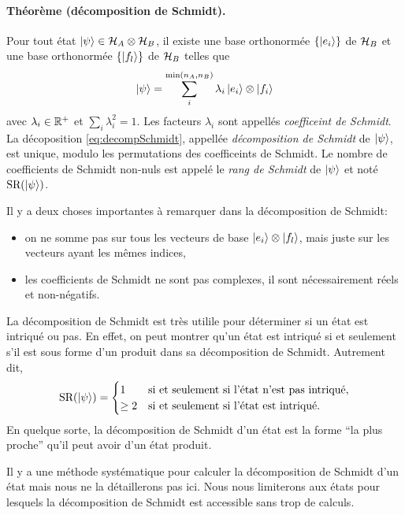 \documentclass[11pt,a4paper,oneside]{article}
\begin{document}
\paragraph*{Théorème (décomposition de Schmidt).} Pour tout état $\ket{\psi}\in\mathcal{H}_A\otimes\mathcal{H}_B$, il existe une base orthonormée $\{\ket{e_i}\}$ de $\mathcal{H}_B$ et une base orthonormée $\{\ket{f_l}\}$ de $\mathcal{H}_B$ telles que
\begin{equation}
    \ket{\psi}=\sum^{\min(n_A,n_B)}_{i} \lambda_i \ket{e_i}\otimes\ket{f_i}\label{eq:decompSchmidt}
\end{equation}
avec $\lambda_i\in\mathbb{R}^+$ et $\sum_i\lambda^2_i=1$. Les facteurs $\lambda_i$ sont appellés \emph{coefficeint de Schmidt}. La décoposition \eqref{eq:decompSchmidt}, appellée \emph{décomposition de Schmidt} de $\ket{\psi}$, est unique, modulo les permutations des coefficeints de Schmidt. Le nombre de coefficients de Schmidt non-nuls est appelé le \emph{rang de Schmidt} de $\ket{\psi}$ et noté $\text{SR}(\ket{\psi})$.

Il y a deux choses importantes à remarquer dans la décomposition de Schmidt:
\begin{itemize}
    \item on ne somme pas sur tous les vecteurs de base $\ket{e_i}\otimes\ket{f_l}$, mais juste sur les vecteurs ayant les mêmes indices,
    \item les coefficients de Schmidt ne sont pas complexes, il sont nécessairement réels et non-négatifs.
\end{itemize}

La décomposition de Schmidt est très utilile pour déterminer si un état est intriqué ou pas. En effet, on peut montrer qu'un état est intriqué si et seulement s'il est sous forme d'un produit dans sa décomposition de Schmidt. Autrement dit, 
\begin{equation}
    \text{SR}(\ket{\psi})=
    \begin{cases}
        1 &\text{si et seulement si l'état n'est pas intriqué},\\
        \geq2 &\text{si et seulement si l'état est intriqué}.
    \end{cases}
\end{equation}
En quelque sorte, la décomposition de Schmidt d'un état est la forme ``la plus proche'' qu'il peut avoir d'un état produit. 

Il y a une méthode systématique pour calculer la décomposition de Schmidt d'un état mais nous ne la détaillerons pas ici. Nous nous limiterons aux états pour lesquels la décomposition de Schmidt est accessible sans trop de calculs.
\end{document}
